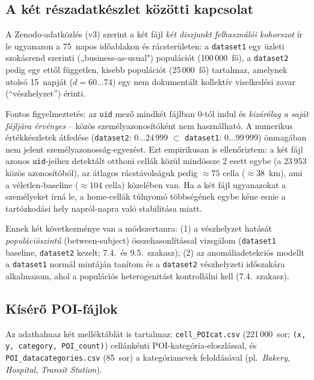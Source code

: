 \subsection{A két részadatkészlet közötti kapcsolat}
\label{subsec:two_datasets}

A Zenodo-adatközlés (v3) szerint a két fájl \emph{két diszjunkt felhasználói kohorszot} ír le ugyanazon a 75~napos időablakon és rácsterületen: a \texttt{dataset1} egy üzleti szokásrend szerinti („business-as-usual") populációt (100\,000~fő), a \texttt{dataset2} pedig egy ettől független, kisebb populációt (25\,000~fő) tartalmaz, amelynek utolsó 15~napját (\(d=60\ldots74\)) egy nem dokumentált kollektív viselkedési zavar (\enquote{vészhelyzet}) érinti.

Fontos figyelmeztetés: az \texttt{uid} mező mindkét fájlban 0-tól indul és \emph{kizárólag a saját fájljára érvényes} -- közös személyazonosítóként nem használható. A numerikus értékkészletek átfedése (\texttt{dataset2}: $0\ldots24\,999$ \(\subset\) \texttt{dataset1}: $0\ldots99\,999$) önmagában nem jelent személyazonosság-egyezést. Ezt empirikusan is ellenőriztem: a két fájl azonos \texttt{uid}-jeihez detektált otthoni cellák közül mindössze 2 esett egybe (a 23\,953 közös azonosítóból), az átlagos rácstávolságuk pedig $\approx 75$ cella ($\approx 38$~km), ami a véletlen-baseline ($\approx 104$ cella) közelében van. Ha a két fájl ugyanazokat a személyeket írná le, a home-cellák túlnyomó többségének egybe kéne esnie a tartózkodási hely napról-napra való stabilitása miatt.

Ennek két következménye van a módszertanra: (1) a vészhelyzet hatását \emph{populációszintű} (between-subject) összehasonlítással vizsgálom (\texttt{dataset1} baseline, \texttt{dataset2} kezelt; 7.4.\ és 9.5.\ szakasz); (2) az anomáliadetekciós modellt a \texttt{dataset1} normál mintáján tanítom és a \texttt{dataset2} vészhelyzeti időszakára alkalmazom, ahol a populációs heterogenitást kontrollálni kell (7.4.\ szakasz).

\subsection{Kísérő POI-fájlok}

Az adathalmaz két melléktáblát is tartalmaz: \texttt{cell\_POIcat.csv} (221\,000~sor; \texttt{(x, y, category, POI\_count)}) cellánkénti POI-kategória-eloszlással, és \texttt{POI\_datacategories.csv} (85~sor) a kategórianevek feloldásával (pl.\ \emph{Bakery}, \emph{Hospital}, \emph{Transit Station}).

